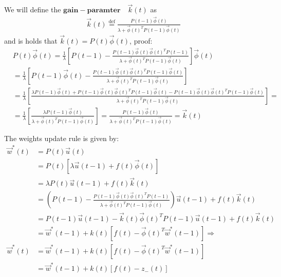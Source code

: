 \documentclass[11pt]{book} %
\begin{document}
We will define the $\mathbf{gain-paramter} \quad \vec{k}(t)$ as 
\begin{align*}
    \vec{k}(t) \stackrel{\text{def}}{=} \frac{P(t-1) \vec{\phi}(t)}{\lambda + \vec{\phi}(t)^T P(t-1) \vec{\phi}(t)}
\end{align*}
and is holds that $\vec{k}(t) = P(t) \vec{\phi}(t)$, proof:
\begin{align*}
    &P(t) \vec{\phi}(t) = \frac{1}{\lambda} \left[ P(t-1) - \frac{P(t-1) \vec{\phi}(t) \vec{\phi}(t)^T P(t-1)}{\lambda + \vec{\phi}(t)^T P(t-1) \vec{\phi}(t)} \right] \vec{\phi}(t) \\
    &= \frac{1}{\lambda} \left[ P(t-1) \vec{\phi}(t) - \frac{P(t-1) \vec{\phi}(t) \vec{\phi}(t)^T P(t-1) \vec{\phi}(t)}{\lambda + \vec{\phi}(t)^T P(t-1) \vec{\phi}(t)} \right] \\
    &= \frac{1}{\lambda} \left[ \frac{\lambda P(t-1) \vec{\phi}(t) + P(t-1) \vec{\phi}(t) \vec{\phi}(t)^T P(t-1) \vec{\phi}(t) - P(t-1) \vec{\phi}(t) \vec{\phi}(t)^T P(t-1) \vec{\phi}(t) } {\lambda + \vec{\phi}(t)^T P(t-1) \vec{\phi}(t)} \right] = \\ 
    &= \frac{1}{\lambda} \left[ \frac{\lambda P(t-1) \vec{\phi}(t)}{\lambda + \vec{\phi}(t)^T P(t-1) \vec{\phi}(t)} \right] 
    = \frac{P(t-1) \vec{\phi}(t)}{\lambda + \vec{\phi}(t)^T P(t-1) \vec{\phi}(t)} = \vec{k}(t)
\end{align*}

The weights update rule is given by:
\begin{align*}
    \vec{w}^*(t) &= P(t) \vec{u}(t) \\
    &= P(t) \left[ \lambda \vec{u}(t-1) + f(t) \vec{\phi}(t) \right] \\
    &= \lambda P(t) \vec{u}(t-1) + f(t) \vec{k}(t) \\ 
    &= \left( P(t-1) - \frac{P(t-1) \vec{\phi}(t) \vec{\phi}(t)^T P(t-1)}{\lambda + \vec{\phi}(t)^T P(t-1) \vec{\phi}(t)} \right) \vec{u}(t-1) + f(t) \vec{k}(t) \\ 
    &= P(t-1) \vec{u}(t-1) - \vec{k}(t) \vec{\phi}(t)^T P(t-1) \vec{u}(t-1) + f(t) \vec{k}(t) \\
    &= \vec{w}^*(t-1) + k(t) \left[ f(t) - \vec{\phi}(t)^T \vec{w}^*(t-1) \right] \Longrightarrow \\
    \vec{w}^*(t) &= \vec{w}^*(t-1) + k(t) \left[ f(t) - \vec{\phi}(t)^T \vec{w}^*(t-1) \right] \\
    &= \vec{w}^*(t-1) + k(t) \left[ f(t) - z_{-} (t) \right]
\end{align*}
\end{document}
